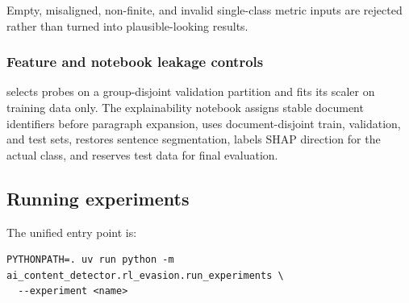 Empty, misaligned, non-finite, and invalid single-class metric inputs
are rejected rather than turned into plausible-looking results.

\subsubsection{Feature and notebook leakage
controls}\label{record-docs-research-guide-md-feature-and-notebook-leakage-controls}

\texttt{} selects probes on a group-disjoint
validation partition and fits its scaler on training data only. The
explainability notebook assigns stable document identifiers before
paragraph expansion, uses document-disjoint train, validation, and test
sets, restores sentence segmentation, labels SHAP direction for the
actual class, and reserves test data for final evaluation.

\subsection{Running
experiments}\label{record-docs-research-guide-md-running-experiments}

The unified entry point is:

\begin{Verbatim}
PYTHONPATH=. uv run python -m ai_content_detector.rl_evasion.run_experiments \
  --experiment <name>
\end{Verbatim}

